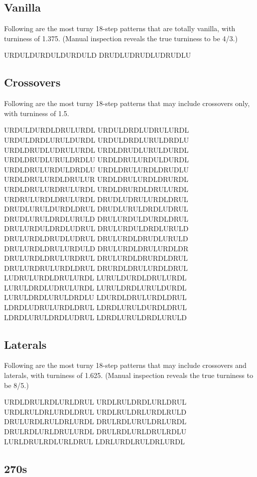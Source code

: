 \documentclass[10pt]{sigplanconf}
\begin{document}

\subsection{Vanilla}

Following are the most turny 18-step patterns that are totally vanilla, with turniness of 1.375. (Manual inspection reveals the true turniness to be 4/3.)

\noindent
URDULDURDULDURDULD
DRUDLUDRUDLUDRUDLU

\subsection{Crossovers}

Following are the most turny 18-step patterns that may include crossovers only, with turniness of 1.5.

\noindent
URDULDURDLDRULURDL
URDULDRDLUDRULURDL
URDULDRDLURULDURDL
URDULDRDLURULDRDLU
URDLDRUDLUDRULURDL
URDLDRUDLURULDURDL
URDLDRUDLURULDRDLU
URDLDRULURDULDURDL
URDLDRULURDULDRDLU
URDLDRULURDLDRUDLU
URDLDRULURDLDRULUR
URDLDRULURDLDRURDL
URDLDRULURDRULURDL
URDLDRURDLDRULURDL
URDRULURDLDRULURDL
DRUDLUDRULURDLDRUL
DRUDLURULDURDLDRUL
DRUDLURULDRDLUDRUL
DRUDLURULDRDLURULD
DRULURDULDURDLDRUL
DRULURDULDRDLUDRUL
DRULURDULDRDLURULD
DRULURDLDRUDLUDRUL
DRULURDLDRUDLURULD
DRULURDLDRULURDULD
DRULURDLDRULURDLDR
DRULURDLDRULURDRUL
DRULURDLDRURDLDRUL
DRULURDRULURDLDRUL
DRURDLDRULURDLDRUL
LUDRULURDLDRULURDL
LURULDURDLDRULURDL
LURULDRDLUDRULURDL
LURULDRDLURULDURDL
LURULDRDLURULDRDLU
LDURDLDRULURDLDRUL
LDRDLUDRULURDLDRUL
LDRDLURULDURDLDRUL
LDRDLURULDRDLUDRUL
LDRDLURULDRDLURULD

\subsection{Laterals}

Following are the most turny 18-step patterns that may include crossovers and laterals, with turniness of 1.625. (Manual inspection reveals the true turniness to be 8/5.)

\noindent
URDLDRULRDLURLDRUL
URDLRULDRDLURLDRUL
URDLRULDRLURDLDRUL
URDLRULDRLURDLRULD
DRULURDLRULDRLURDL
DRULRDLURULDRLURDL
DRULRDLURLDRULURDL
DRULRDLURLDRULRDLU
LURLDRULRDLURLDRUL
LDRLURDLRULDRLURDL

\subsection{270s}
\end{document}

